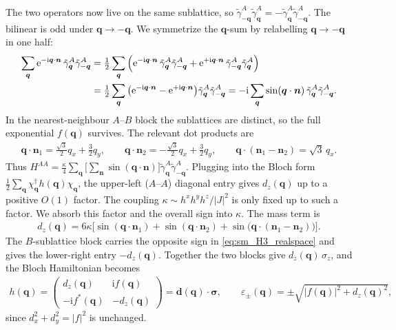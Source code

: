 \documentclass[
  aps,
  prl,
  preprint,
  amsmath,
  amssymb,
  superscriptaddress,
  floatfix
]{revtex4-2}
\newcommand{\ii}{\mathrm{i}}
\newcommand{\ee}{\mathrm{e}}
\renewcommand{\abs}[1]{\left| #1 \right|}
\begin{document}
The two operators now live on the same sublattice, so
$\tilde\gamma_{-\bm q}^{A}\tilde\gamma_{\bm q}^{A} = -\tilde\gamma_{\bm
q}^{A}\tilde\gamma_{-\bm q}^{A}$. The bilinear is odd under $\bm
q\to-\bm q$. We symmetrize the $\bm q$-sum by relabelling $\bm q\to-\bm q$
in one half:
\begin{align}
  \sum_{\bm q}\ee^{-\ii\bm q\cdot\bm n}\,\tilde\gamma_{\bm q}^{A}\tilde\gamma_{-\bm q}^{A}
  &= \tfrac12\sum_{\bm q}\Big(\ee^{-\ii\bm q\cdot\bm n}\,\tilde\gamma_{\bm q}^{A}\tilde\gamma_{-\bm q}^{A}+\ee^{+\ii\bm q\cdot\bm n}\,\tilde\gamma_{-\bm q}^{A}\tilde\gamma_{\bm q}^{A}\Big) \notag\\
  &= \tfrac12\sum_{\bm q}\big(\ee^{-\ii\bm q\cdot\bm n}-\ee^{+\ii\bm q\cdot\bm n}\big)\tilde\gamma_{\bm q}^{A}\tilde\gamma_{-\bm q}^{A}
   = -\ii\sum_{\bm q}\sin(\bm q\cdot\bm n)\,\tilde\gamma_{\bm q}^{A}\tilde\gamma_{-\bm q}^{A}.
\end{align}
In the nearest-neighbour $A$--$B$ block the sublattices are distinct, so
the full exponential $f(\bm q)$ survives. The relevant dot
products are
\begin{align}
  \bm q\cdot\bm n_1=\tfrac{\sqrt3}{2}q_x+\tfrac32 q_y,\qquad
  \bm q\cdot\bm n_2=-\tfrac{\sqrt3}{2}q_x+\tfrac32 q_y,\qquad
  \bm q\cdot(\bm n_1-\bm n_2)=\sqrt3\,q_x .
\end{align}
Thus $H^{AA}=\tfrac{\kappa}{4}\sum_{\bm q}\big[\sum_{\bm n}\sin(\bm
q\cdot\bm n)\big]\tilde\gamma^A_{\bm q}\tilde\gamma^A_{-\bm q}$. Plugging
into the Bloch form $\tfrac12\sum_{\bm q}\chi^\dag_{\bm q}h(\bm
q)\chi_{\bm q}$, the upper-left ($A$--$A$) diagonal entry gives
$d_z(\bm q)$ up to a positive $O(1)$ factor. The coupling $\kappa\sim
h^xh^yh^z/\abs{J}^2$ is only fixed up to such a factor. We absorb this
factor and the overall sign into $\kappa$. The mass term is
\begin{align}
  d_z(\bm q) = 6\kappa\Big[\sin(\bm q\cdot\bm n_1) + \sin(\bm q\cdot\bm n_2)
  + \sin\!\big(\bm q\cdot(\bm n_1-\bm n_2)\big)\Big].
  \label{eq:sm_dz}
\end{align}
The $B$-sublattice block carries the opposite sign in
\cref{eq:sm_H3_realspace} and gives the lower-right entry $-d_z(\bm q)$.
Together the two blocks give $d_z(\bm q)\,\sigma_z$, and the Bloch
Hamiltonian becomes
\begin{align}
  h(\bm q)=\begin{pmatrix} d_z(\bm q) & \ii f(\bm q)\\[2pt] -\ii f^*(\bm q) & -d_z(\bm q)\end{pmatrix}
  =\bm d(\bm q)\cdot\bm\sigma,
  \qquad
  \varepsilon_\pm(\bm q)=\pm\sqrt{\abs{f(\bm q)}^2+d_z(\bm q)^2},
  \label{eq:sm_h_gapped}
\end{align}
since $d_x^2+d_y^2=\abs{f}^2$ is unchanged.
\end{document}
